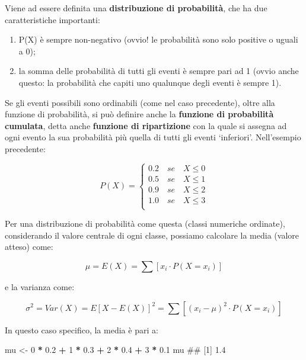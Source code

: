 \documentclass[a4paper,12pt,oneside]{book}
\providecommand{\tightlist}{%
  \setlength{\itemsep}{0pt}\setlength{\parskip}{0pt}}
\newenvironment{Shaded}{\begin{snugshade}}{\end{snugshade}}
\newcommand{\DecValTok}[1]{\textcolor[rgb]{0.00,0.00,0.81}{#1}}
\newcommand{\FloatTok}[1]{\textcolor[rgb]{0.00,0.00,0.81}{#1}}
\newcommand{\StringTok}[1]{\textcolor[rgb]{0.31,0.60,0.02}{#1}}
\newcommand{\OperatorTok}[1]{\textcolor[rgb]{0.81,0.36,0.00}{\textbf{#1}}}
\newcommand{\NormalTok}[1]{#1}
\theoremstyle{definition}
\theoremstyle{definition}
\theoremstyle{definition}
\theoremstyle{remark}
\begin{document}
Viene ad essere definita una \textbf{distribuzione di probabilità}, che
ha due caratteristiche importanti:

\begin{enumerate}
\def\labelenumi{\arabic{enumi}.}
\tightlist
\item
  P(X) è sempre non-negativo (ovvio! le probabilità sono solo positive o
  uguali a 0);
\item
  la somma delle probabilità di tutti gli eventi è sempre pari ad 1
  (ovvio anche questo: la probabilità che capiti uno qualunque degli
  eventi è sempre 1).
\end{enumerate}

Se gli eventi possibili sono ordinabili (come nel caso precedente),
oltre alla funzione di probabilità, si può definire anche la
\textbf{funzione di probabilità cumulata}, detta anche \textbf{funzione
di ripartizione} con la quale si assegna ad ogni evento la sua
probabilità più quella di tutti gli eventi `inferiori'. Nell'esempio
precedente:

\[
P(X) = \left\{ \begin{array}{l}
 0.2\,\,\,\,\,\,se\,\,\,\,\,\,X \leq 0 \\ 
 0.5\,\,\,\,\,\,se\,\,\,\,\,\,X \leq 1 \\ 
 0.9\,\,\,\,\,\,se\,\,\,\,\,\,X \leq 2 \\ 
 1.0\,\,\,\,\,\,se\,\,\,\,\,\,X \leq 3 \\ 
 \end{array} \right.
\]

Per una distribuzione di probabilità come questa (classi numeriche
ordinate), considerando il valore centrale di ogni classe, possiamo
calcolare la media (valore atteso) come:

\[
\mu  = E(X) = \sum{\left[ x_i \cdot P(X = x_i ) \right]}
\]

e la varianza come:

\[\sigma ^2  = Var(X) = E\left[ {X - E(X)} \right]^2  = \sum{ \left[ {\left( {x_i  - \mu } \right)^2 \cdot P(X = x_i )} \right]}\]

In questo caso specifico, la media è pari a:

\begin{Shaded}
\begin{Highlighting}[]
\NormalTok{mu <-}\StringTok{ }\DecValTok{0} \OperatorTok{*}\StringTok{ }\FloatTok{0.2} \OperatorTok{+}\StringTok{ }\DecValTok{1} \OperatorTok{*}\StringTok{ }\FloatTok{0.3} \OperatorTok{+}\StringTok{ }\DecValTok{2} \OperatorTok{*}\StringTok{ }\FloatTok{0.4} \OperatorTok{+}\StringTok{ }\DecValTok{3} \OperatorTok{*}\StringTok{ }\FloatTok{0.1}
\NormalTok{mu}
\NormalTok{## [1] 1.4}
\end{Highlighting}
\end{Shaded}
\end{document}
